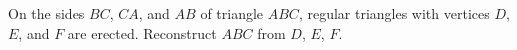 On the sides $BC$, $CA$, and $AB$ of triangle $ABC$, regular triangles with vertices $D$, $E$, and $F$ are erected. Reconstruct $ABC$ from $D$, $E$, $F$.
